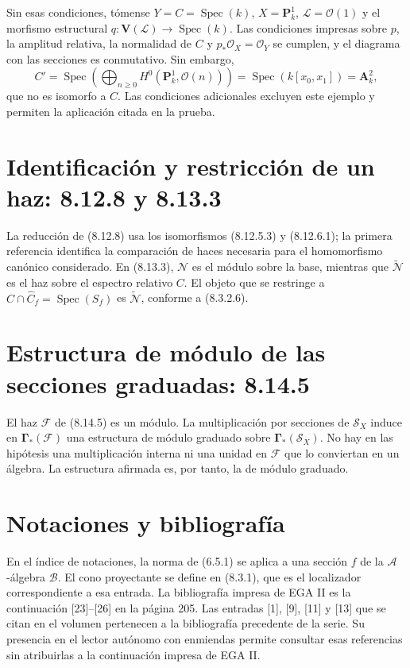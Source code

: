 \documentclass[11pt,a4paper]{article}
\DeclareMathOperator{\Spec}{Spec}
\begin{document}
Sin esas condiciones, tómense $Y=C=\Spec(k)$,
$X=\mathbf P^1_k$, $\mathcal L=\mathcal O(1)$ y el morfismo
estructural $q:\mathbf V(\mathcal L)\to\Spec(k)$.
Las condiciones impresas sobre $p$, la amplitud relativa, la
normalidad de $C$ y $p_*\mathcal O_X=\mathcal O_Y$ se cumplen,
y el diagrama con las secciones es conmutativo. Sin embargo,
\[
C'=\Spec\!\left(\bigoplus_{n\geq0}
              H^0(\mathbf P^1_k,\mathcal O(n))\right)
   =\Spec(k[x_0,x_1])=\mathbf A^2_k,
\]
que no es isomorfo a $C$. Las condiciones adicionales excluyen
este ejemplo y permiten la aplicación citada en la prueba.

\section{Identificación y restricción de un haz: 8.12.8 y 8.13.3}
La reducción de (8.12.8) usa los isomorfismos (8.12.5.3) y
(8.12.6.1); la primera referencia identifica la comparación de
haces necesaria para el homomorfismo canónico considerado.
En (8.13.3), $\mathcal N$ es el módulo sobre la base, mientras
que $\widetilde{\mathcal N}$ es el haz sobre el espectro relativo
$C$. El objeto que se restringe a
$C\cap\widehat C_f=\Spec(S_f)$ es
$\widetilde{\mathcal N}$, conforme a (8.3.2.6).

\section{Estructura de módulo de las secciones graduadas: 8.14.5}
El haz $\mathcal F$ de (8.14.5) es un módulo. La multiplicación
por secciones de $\mathcal S_X$ induce en
$\boldsymbol\Gamma_*(\mathcal F)$ una estructura de módulo
graduado sobre $\boldsymbol\Gamma_*(\mathcal S_X)$.
No hay en las hipótesis una multiplicación interna ni una unidad
en $\mathcal F$ que lo conviertan en un álgebra. La estructura
afirmada es, por tanto, la de módulo graduado.

\section{Notaciones y bibliografía}
En el índice de notaciones, la norma de (6.5.1) se aplica a una
sección $f$ de la $\mathcal A$-álgebra $\mathcal B$.
El cono proyectante se define en (8.3.1), que es el localizador
correspondiente a esa entrada.
La bibliografía impresa de EGA II es la continuación [23]--[26]
en la página 205. Las entradas [1], [9], [11] y [13] que se citan
en el volumen pertenecen a la bibliografía precedente de la serie.
Su presencia en el lector autónomo con enmiendas permite consultar
esas referencias sin atribuirlas a la continuación impresa de EGA II.
\end{document}
